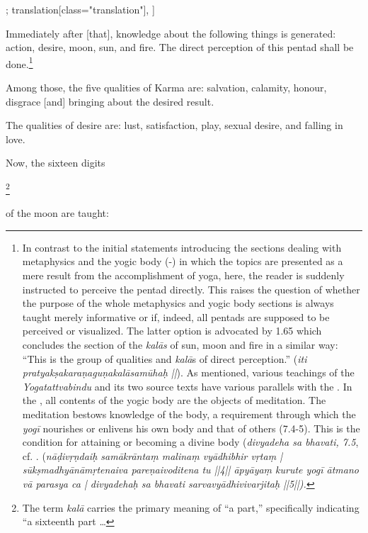 \begin{alignment}[
  texts=edition[class="edition"];
  translation[class="translation"],
  ]
\begin{translation}
\begin{tlate}[p53_01]
Immediately after [that], knowledge about the following things is generated: action, desire, moon, sun, and fire. The direct perception of this pentad shall be done.\footnote{In contrast to the initial statements introducing the sections dealing with metaphysics and the yogic body (-) in which the topics are presented as a mere result from the accomplishment of yoga, here, the reader is suddenly instructed to perceive the pentad directly. This raises the question of whether the purpose of the whole metaphysics and yogic body sections is always taught merely informative or if, indeed, all pentads are supposed to be perceived or visualized. The latter option is advocated by  1.65 which concludes the section of the \textit{kalās} of sun, moon and fire in a similar way: ``This is the group of qualities and \textit{kalā}s of direct perception.'' (\textit{iti pratyakṣakaraṇaguṇakalāsamūhaḥ ||}). As mentioned, various teachings of the \textit{Yogatattvabindu} and its two source texts have various parallels with the . In the , all contents of the yogic body are the objects of meditation. The meditation bestows knowledge of the body, a requirement through which the \textit{yogī} nourishes or enlivens his own body and that of others (7.4-5). This is the condition for attaining or becoming a divine body (\textit{divyadeha sa bhavati, 7.5}, cf. \citeauthor[2019:44,152-153,166-167]{bäumernetra}. (\textit{nāḍivṛṇdaiḥ samākrāntaṃ malinaṃ vyādhibhir vṛtaṃ | sūkṣmadhyānāmṛtenaiva pareṇaivoditena tu ||4|| āpyāyaṃ kurute yogī ātmano vā parasya ca | divyadehaḥ sa bhavati sarvavyādhivivarjitaḥ ||5||).}}    

Among those, the five qualities of Karma are: salvation, calamity, honour, disgrace [and] bringing about the desired result.
      
The qualities of desire are: lust, satisfaction, play, sexual desire, and falling in love.
\end{tlate}
               \label{karmapentad}
               \begin{tlate}[p54_01]
                 \noindent
                 Now, the sixteen digits\begin{buber}[f54_1]\footnote{The term \textit{kalā} carries the primary meaning of ``a part,'' specifically indicating ``a sixteenth part \ldots}\end{buber} of the moon are taught:\\


\end{tlate}
\end{translation}
\end{alignment}
